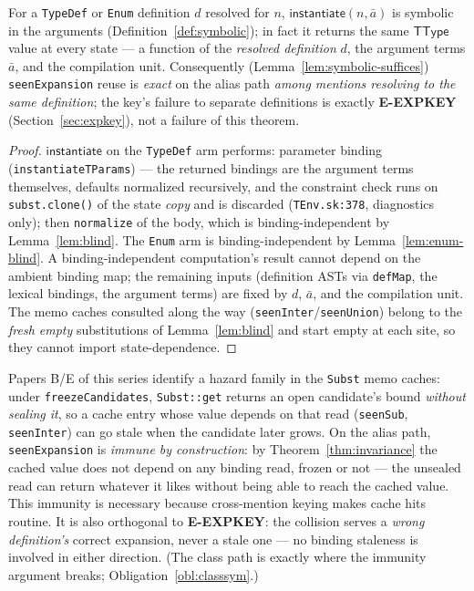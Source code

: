 \documentclass[11pt]{article}
\newcommand{\TType}{\mathsf{TType}}
\newcommand{\instop}{\mathsf{instantiate}}
\begin{document}
\begin{theorem}
\label{thm:invariance}
For a \texttt{TypeDef} or \texttt{Enum} definition $d$ resolved for
$n$, $\instop(n,\bar{a})$ is symbolic in the arguments
(Definition~\ref{def:symbolic}); in fact it returns the same $\TType$
value at every state — a function of the \emph{resolved definition} $d$,
the argument terms $\bar{a}$, and the compilation unit. Consequently
(Lemma~\ref{lem:symbolic-suffices}) \texttt{seenExpansion} reuse is
\emph{exact} on the alias path \emph{among mentions resolving to the
same definition}; the key's failure to separate definitions is exactly
\textbf{E-EXPKEY} (Section~\ref{sec:expkey}), not a failure of this
theorem.
\end{theorem}
\begin{proof}
$\instop$ on the \texttt{TypeDef} arm performs: parameter binding
(\texttt{instantiateTParams}) — the returned bindings are the argument
terms themselves, defaults normalized recursively, and the constraint
check runs on \texttt{subst.clone()} of the state \emph{copy} and is
discarded (\texttt{TEnv.sk:378}, diagnostics only); then
\texttt{normalize} of the body, which is binding-independent by
Lemma~\ref{lem:blind}. The \texttt{Enum} arm is binding-independent by
Lemma~\ref{lem:enum-blind}. A binding-independent computation's result cannot
depend on the ambient binding map; the remaining inputs (definition
ASTs via \texttt{defMap}, the lexical bindings, the argument terms) are
fixed by $d$, $\bar{a}$, and the compilation unit. The memo caches
consulted along the way (\texttt{seenInter}/\texttt{seenUnion}) belong
to the \emph{fresh empty} substitutions of Lemma~\ref{lem:blind} and
start empty at each site, so they cannot import state-dependence.
\end{proof}

\begin{corollary}
\label{cor:freeze}
Papers B/E of this series identify a hazard family in the
\texttt{Subst} memo caches: under \texttt{freezeCandidates},
\texttt{Subst::get} returns an open candidate's bound \emph{without
sealing it}, so a cache entry whose value depends on that read
(\texttt{seenSub}, \texttt{seenInter}) can go stale when the candidate
later grows. On the alias path, \texttt{seenExpansion} is \emph{immune
by construction}: by Theorem~\ref{thm:invariance} the cached value does
not depend on any binding read, frozen or not — the unsealed read can
return whatever it likes without being able to reach the cached value.
This immunity is necessary because
cross-mention keying makes cache hits routine. It is also orthogonal to
\textbf{E-EXPKEY}: the collision serves a \emph{wrong definition's}
correct expansion, never a stale one — no binding staleness is
involved in either direction. (The class path is exactly where the
immunity argument breaks; Obligation~\ref{obl:classsym}.)
\end{corollary}
\end{document}
